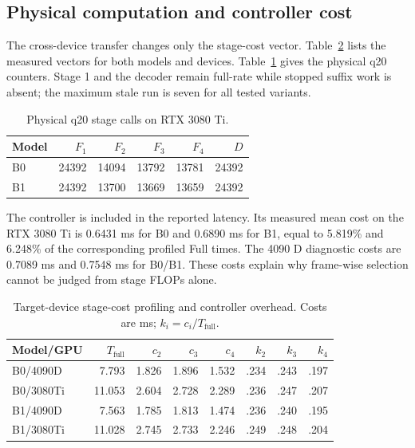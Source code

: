 \documentclass{article}
\begin{document}
\subsection{Physical computation and controller cost}
The cross-device transfer changes only the stage-cost vector. Table~\ref{tab:profile} lists the measured vectors for both models and devices. Table~\ref{tab:calls} gives the physical q20 counters. Stage 1 and the decoder remain full-rate while stopped suffix work is absent; the maximum stale run is seven for all tested variants.

\begin{table}[t]
\centering
\caption{Physical q20 stage calls on RTX 3080 Ti.}
\label{tab:calls}
\scriptsize
\setlength{\tabcolsep}{2.4pt}
\begin{tabular}{lrrrrr}
\toprule
Model & $F_1$ & $F_2$ & $F_3$ & $F_4$ & $D$ \\
\midrule
B0 & 24392 & 14094 & 13792 & 13781 & 24392 \\
B1 & 24392 & 13700 & 13669 & 13659 & 24392 \\
\bottomrule
\end{tabular}
\end{table}

The controller is included in the reported latency. Its measured mean cost on the RTX 3080 Ti is 0.6431 ms for B0 and 0.6890 ms for B1, equal to 5.819\% and 6.248\% of the corresponding profiled Full times. The 4090 D diagnostic costs are 0.7089 ms and 0.7548 ms for B0/B1. These costs explain why frame-wise selection cannot be judged from stage FLOPs alone.

\begin{table}[t]
\centering
\caption{Target-device stage-cost profiling and controller overhead. Costs are ms; $k_i=c_i/T_{\mathrm{full}}$.}
\label{tab:profile}
\scriptsize
\setlength{\tabcolsep}{2.6pt}
\begin{tabular}{lrrrrrrr}
\toprule
Model/GPU & $T_{\mathrm{full}}$ & $c_2$ & $c_3$ & $c_4$ & $k_2$ & $k_3$ & $k_4$ \\
\midrule
B0/4090D & 7.793 & 1.826 & 1.896 & 1.532 & .234 & .243 & .197 \\
B0/3080Ti & 11.053 & 2.604 & 2.728 & 2.289 & .236 & .247 & .207 \\
B1/4090D & 7.563 & 1.785 & 1.813 & 1.474 & .236 & .240 & .195 \\
B1/3080Ti & 11.028 & 2.745 & 2.733 & 2.246 & .249 & .248 & .204 \\
\bottomrule
\end{tabular}
\end{table}
\end{document}
